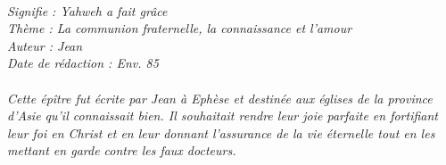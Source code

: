 \BFont
\noindent\hrulefill
{\footnotesize
\textit{
\bigskip
{\centering{}
\\Signifie : Yahweh a fait grâce
\\Thème : La communion fraternelle, la connaissance et l'amour
\\Auteur : Jean
\\Date de rédaction : Env. 85\\}
}
\textit{
\\Cette épître fut écrite par Jean à Ephèse et destinée aux églises de la province d’Asie qu’il connaissait bien. Il souhaitait rendre leur joie parfaite en fortifiant leur foi en Christ et en leur donnant l’assurance de la vie éternelle tout en les mettant en garde contre les faux docteurs.\bigskip
}
}
\par\nobreak\noindent\hrulefill
